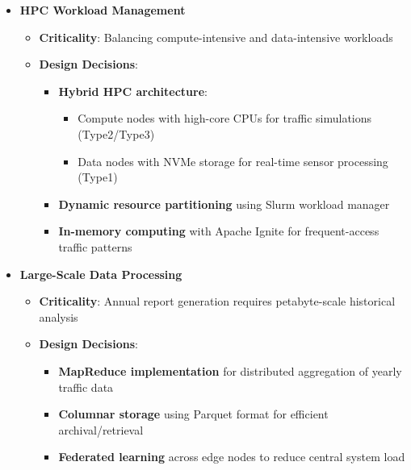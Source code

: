 \documentclass[11.5pt]{article}
\begin{document}
\begin{itemize}
        \item \textbf{HPC Workload Management}
        \begin{itemize}
            \item \textbf{Criticality}: Balancing compute-intensive and data-intensive workloads
            \item \textbf{Design Decisions}:
            \begin{itemize}
                \item \textbf{Hybrid HPC architecture}: 
                \begin{itemize}
                    \item Compute nodes with high-core CPUs for traffic simulations (Type2/Type3)
                    \item Data nodes with NVMe storage for real-time sensor processing (Type1)
                \end{itemize}
                \item \textbf{Dynamic resource partitioning} using Slurm workload manager
                \item \textbf{In-memory computing} with Apache Ignite for frequent-access traffic patterns
            \end{itemize}
        \end{itemize}
    
        \item \textbf{Large-Scale Data Processing}
        \begin{itemize}
            \item \textbf{Criticality}: Annual report generation requires petabyte-scale historical analysis
            \item \textbf{Design Decisions}:
            \begin{itemize}
                \item \textbf{MapReduce implementation} for distributed aggregation of yearly traffic data
                \item \textbf{Columnar storage} using Parquet format for efficient archival/retrieval
                \item \textbf{Federated learning} across edge nodes to reduce central system load
            \end{itemize}
        \end{itemize}
    

\end{itemize}
\end{document}
